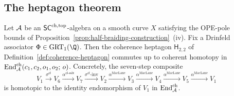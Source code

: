 \subsection{The heptagon theorem}

\begin{theorem}
\label{thm:coherence-heptagon}%
%
%
%
Let $\mathcal{A}$ be an $\mathsf{SC}^{\mathrm{ch},\mathrm{top}}$-algebra on a smooth curve $X$ satisfying
the OPE-pole bounds of
Proposition~\ref{prop:half-braiding-construction}~(iv). Fix a Drinfeld
associator $\Phi\in\mathrm{GRT}_1(\Q)$. Then the coherence heptagon
$\mathsf{H}_{2,2}$ of Definition~\ref{def:coherence-heptagon}
commutes up to coherent homotopy in
$\operatorname{End}^{\mathrm{ch}}_{\mathcal{A}}(c_1, c_2, o_1, o_2;\,o)$. Concretely,
the seven-step composite
\[
V_1 \xrightarrow{\sigma^{\mathsf{cl}}} V_6
\xrightarrow{\alpha^{\mathsf{cl}\text{-}\mathsf{mix}}} V_7
\xrightarrow{\sigma^{\mathsf{cl}}\text{-inv}} V_2
\xrightarrow{\alpha^{\mathrm{MacLane}}} V_3
\xrightarrow{\alpha^{\mathrm{MacLane}}} V_4
\xrightarrow{\alpha^{\mathrm{MacLane}}} V_5
\xrightarrow{\alpha^{\mathrm{MacLane}}} V_1
\]
is homotopic to the identity endomorphism of $V_1$ in
$\operatorname{End}^{\mathrm{ch}}_{\mathcal{A}}$.
\end{theorem}

